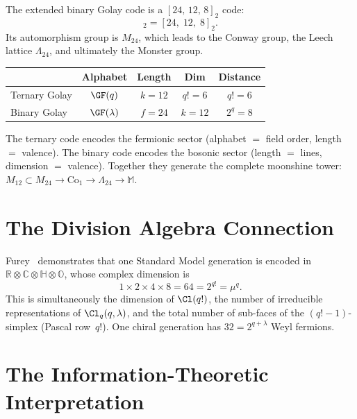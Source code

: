 The extended binary Golay code is a $[24,\,12,\,8]_2$ code:
\begin{equation}
[f,\; k,\; 2^q]_2 = [24,\; 12,\; 8]_2.
\end{equation}
Its automorphism group is $M_{24}$, which leads to the
Conway group, the Leech lattice $\Lambda_{24}$, and ultimately
the Monster group.

\begin{theorem}[Two Golay Codes $=$ Two Faces of W(3,3)]
\begin{center}
\begin{tabular}{@{}lcccc@{}}
\toprule
& Alphabet & Length & Dim & Distance \\
\midrule
Ternary Golay & $\GF(q)$ & $k=12$ & $q!=6$ & $q!=6$ \\
Binary Golay & $\GF(\lambda)$ & $f=24$ & $k=12$ & $2^q=8$ \\
\bottomrule
\end{tabular}
\end{center}
The ternary code encodes the fermionic sector
(alphabet $=$ field order, length $=$ valence).
The binary code encodes the bosonic sector
(length $=$ lines, dimension $=$ valence).
Together they generate the complete moonshine tower:
$M_{12}\subset M_{24}\to\mathrm{Co}_1\to\Lambda_{24}\to\mathbb{M}$.
\end{theorem}


\section{The Division Algebra Connection}
\label{sec:furey}

Furey~\cite{Furey2022} demonstrates that one Standard Model generation
is encoded in $\mathbb{R}\otimes\mathbb{C}\otimes\mathbb{H}\otimes\mathbb{O}$,
whose complex dimension is
\begin{equation}
1\times 2\times 4\times 8 = 64 = 2^{q!} = \mu^q.
\end{equation}
This is simultaneously the dimension of $\Cl(q!)$, the number of
irreducible representations of $\Cl_q(q,\lambda)$, and the total
number of sub-faces of the $(q!{-}1)$-simplex (Pascal row~$q!$).
One chiral generation has $32 = 2^{q+\lambda}$ Weyl fermions.


\section{The Information-Theoretic Interpretation}
\label{sec:info-theory}

